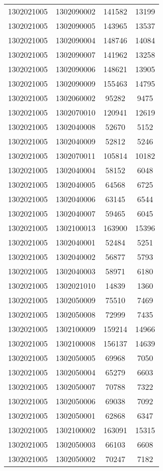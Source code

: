 \begin{longtable}{llcc}
1302021005 & 1302090002 & 141582 & 13199\\
1302021005 & 1302090005 & 143965 & 13537\\
1302021005 & 1302090004 & 148746 & 14084\\
1302021005 & 1302090007 & 141962 & 13258\\
1302021005 & 1302090006 & 148621 & 13905\\
1302021005 & 1302090009 & 155463 & 14795\\
1302021005 & 1302060002 & 95282 & 9475\\
1302021005 & 1302070010 & 120941 & 12619\\
1302021005 & 1302040008 & 52670 & 5152\\
1302021005 & 1302040009 & 52812 & 5246\\
1302021005 & 1302070011 & 105814 & 10182\\
1302021005 & 1302040004 & 58152 & 6048\\
1302021005 & 1302040005 & 64568 & 6725\\
1302021005 & 1302040006 & 63145 & 6544\\
1302021005 & 1302040007 & 59465 & 6045\\
1302021005 & 1302100013 & 163900 & 15396\\
1302021005 & 1302040001 & 52484 & 5251\\
1302021005 & 1302040002 & 56877 & 5793\\
1302021005 & 1302040003 & 58971 & 6180\\
1302021005 & 1302021010 & 14839 & 1360\\
1302021005 & 1302050009 & 75510 & 7469\\
1302021005 & 1302050008 & 72999 & 7435\\
1302021005 & 1302100009 & 159214 & 14966\\
1302021005 & 1302100008 & 156137 & 14639\\
1302021005 & 1302050005 & 69968 & 7050\\
1302021005 & 1302050004 & 65279 & 6603\\
1302021005 & 1302050007 & 70788 & 7322\\
1302021005 & 1302050006 & 69038 & 7092\\
1302021005 & 1302050001 & 62868 & 6347\\
1302021005 & 1302100002 & 163091 & 15315\\
1302021005 & 1302050003 & 66103 & 6608\\
1302021005 & 1302050002 & 70247 & 7182\\

\end{longtable}
